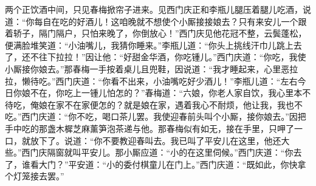 两个正饮酒中间，只见春梅掀帘子进来。见西门庆正和李瓶儿腿压着腿儿吃酒，说道：“你每自在吃的好酒儿！这咱晚就不想使个小厮接接娘去？只有来安儿一个跟着轿子，隔门隔户，只怕来晚了，你倒放心！”西门庆见他花冠不整，云鬓蓬松，便满脸堆笑道：“小油嘴儿，我猜你睡来。”李瓶儿道：“你头上挑线汗巾儿跳上去了，还不往下拉拉！”因让他：“好甜金华酒，你吃锺儿。”西门庆道：“你吃，我使小厮接你娘去。”那春梅一手按着桌儿且兜鞋，因说道：“我才睡起来，心里恶拉拉，懒待吃。”西门庆道：“你看不出来，小油嘴吃好少酒儿！”李瓶儿道：“左右今日你娘不在，你吃上一锺儿怕怎的？”春梅道：“六娘，你老人家自饮，我心里本不待吃，俺娘在家不在家便怎的？就是娘在家，遇着我心不耐烦，他让我，我也不吃。”西门庆道：“你不吃，喝口茶儿罢。我使迎春前头叫个小厮，接你娘去。”因把手中吃的那盏木樨芝麻薰笋泡茶递与他。那春梅似有如无，接在手里，只呷了一口，就放下了。说道：“你不要教迎春叫去。我已叫了平安儿在这里，他还大些。”西门庆隔窗就叫平安儿。那小厮应道：“小的在这里伺候。”西门庆道：“你去了，谁看大门？”平安道：“小的委付棋童儿在门上。”西门庆道：“既如此，你快拿个灯笼接去罢。”

